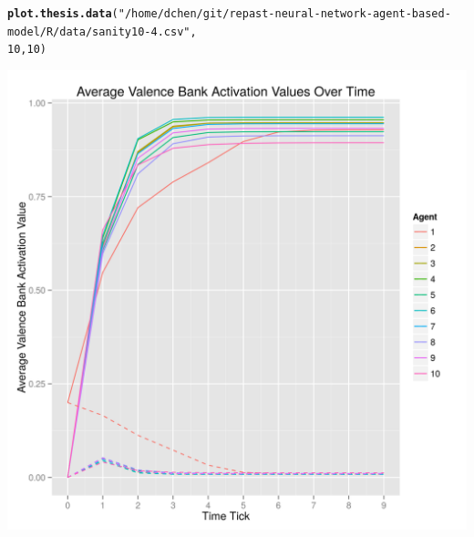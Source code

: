 \documentclass{article}\usepackage[]{graphicx}\usepackage[]{color}
\makeatletter
\def\maxwidth{ %
  \ifdim\Gin@nat@width>\linewidth
    \linewidth
  \else
    \Gin@nat@width
  \fi
}
\newcommand{\hlnum}[1]{\textcolor[rgb]{0.686,0.059,0.569}{#1}}%
\newcommand{\hlstr}[1]{\textcolor[rgb]{0.192,0.494,0.8}{#1}}%
\newcommand{\hlstd}[1]{\textcolor[rgb]{0.345,0.345,0.345}{#1}}%
\newcommand{\hlkwd}[1]{\textcolor[rgb]{0.737,0.353,0.396}{\textbf{#1}}}%
\newenvironment{kframe}{%
 \def\at@end@of@kframe{}%
 \ifinner\ifhmode%
  \def\at@end@of@kframe{\end{minipage}}%
  \begin{minipage}{\columnwidth}%
 \fi\fi%
 \def\FrameCommand##1{\hskip\@totalleftmargin \hskip-\fboxsep
 \colorbox{shadecolor}{##1}\hskip-\fboxsep
     \hskip-\linewidth \hskip-\@totalleftmargin \hskip\columnwidth}%
 \MakeFramed {\advance\hsize-\width
   \@totalleftmargin\z@ \linewidth\hsize
   \@setminipage}}%
 {\par\unskip\endMakeFramed%
 \at@end@of@kframe}
\newenvironment{knitrout}{}{} %
\makeatother
\begin{document}
\newpage
\begin{knitrout}
\color{fgcolor}\begin{kframe}
\begin{alltt}
\hlkwd{plot.thesis.data}\hlstd{(}\hlstr{"/home/dchen/git/repast-neural-network-agent-based-model/R/data/sanity10-4.csv"}\hlstd{,}
    \hlnum{10}\hlstd{,} \hlnum{10}\hlstd{)}
\end{alltt}
\end{kframe}
\includegraphics[width=\maxwidth]{figure/unnamed-chunk-4} 

\end{knitrout}
\end{document}
